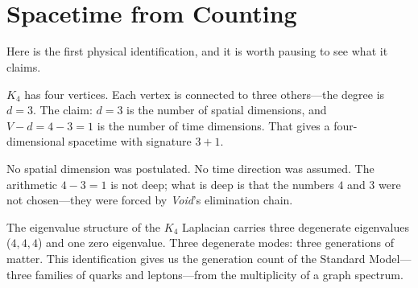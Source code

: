\documentclass[11pt,a4paper]{book}
\newcommand{\VoidRef}[2]{\textit{#2} (in \textit{Void})}
\begin{document}
\begin{code}
\\
%
\\[\AgdaEmptyExtraSkip]%
\>[0]\AgdaSpace{}%
\AgdaSymbol{:}\AgdaSpace{}%
\<%
\\
\>[0]\AgdaSpace{}%
\AgdaSymbol{=}\AgdaSpace{}%
\AgdaSpace{}%
\AgdaSpace{}%
%
\>[41]\<%
\\
%
\\[\AgdaEmptyExtraSkip]%
\>[0]\AgdaSpace{}%
\AgdaSymbol{:}\AgdaSpace{}%
\<%
\\
\>[0]\AgdaSpace{}%
\AgdaSymbol{=}\AgdaSpace{}%
\AgdaSpace{}%
\<%
\\
%
\\[\AgdaEmptyExtraSkip]%
\>[0]\AgdaSpace{}%
\AgdaSymbol{:}\AgdaSpace{}%
\<%
\\
\>[0]\AgdaSpace{}%
\AgdaSymbol{=}\AgdaSpace{}%
\AgdaSpace{}%
\AgdaSpace{}%
%
\>[46]\<%
\end{code}

\section{Spacetime from Counting}

Here is the first physical identification, and it is worth pausing to see what it claims.

$K_4$ has four vertices. Each vertex is connected to three others---the degree is $d = 3$. The claim: $d = 3$ is the number of spatial dimensions, and $V - d = 4 - 3 = 1$ is the number of time dimensions. That gives a four-dimensional spacetime with signature $3 + 1$.

No spatial dimension was postulated. No time direction was assumed. The arithmetic $4 - 3 = 1$ is not deep; what is deep is that the numbers $4$ and $3$ were not chosen---they were forced by \textit{Void}'s elimination chain.%

The eigenvalue structure of the $K_4$ Laplacian carries three degenerate eigenvalues ($4, 4, 4$) and one zero eigenvalue. Three degenerate modes: three generations of matter. This identification gives us the generation count of the Standard Model---three families of quarks and leptons---from the multiplicity of a graph spectrum.
\end{document}
